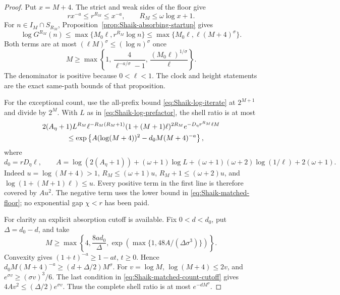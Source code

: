 \begin{proof}
Put \(x=M+4\). The strict and weak sides of the floor give
\begin{equation}\label{eq:Shaik-matched-floor}
 r x^{-a}\le r^{R_M}\le x^{-a},\qquad
 R_M\le\omega\log x+1 .
\end{equation}
For \(n\in I_M\cap S_{R_M}\),
Proposition~\ref{prop:Shaik-absorbing-startup} gives
\[
 \log G^{R_M}(n)
 \le\max\{M_0\ell,r^{R_M}\log n\}
 \le\max\{M_0\ell,\ell(M+4)^\sigma\}.
\]
Both terms are at most \((\ell M)^\sigma\le(\log n)^\sigma\)
once
\begin{equation}\label{eq:Shaik-matched-landing-cutoff}
 M\ge
 \max\left\{1,\,
 \frac4{\ell^{-a/\sigma}-1},\,
 \frac{(M_0\ell)^{1/\sigma}}{\ell}\right\}.
\end{equation}
The denominator is positive because \(0<\ell<1\).
The clock and height statements are the exact same-path bounds
of that proposition.

For the exceptional count, use the all-prefix bound
\eqref{eq:Shaik-log-iterate} at \(2^{M+1}\) and divide by \(2^M\).
With \(L\) as in \eqref{eq:Shaik-log-prefactor}, the shell ratio is at most
\begin{align}
 &2(A_\eta+1)L^{R_M}\ell^{-R_M(R_M+1)}
        (1+(M+1)\ell)^{2R_M}
        e^{-D_\eta r^{R_M}\ell M}\nonumber\\
 &\hspace{12mm}\le
 \exp\left\{A(\log(M+4))^2
             -d_0 M(M+4)^{-a}\right\},\label{eq:Shaik-matched-shell}
\end{align}
where
\[
 d_0=rD_\eta\ell,\qquad
 A=\log(2(A_\eta+1))+(\omega+1)\log L
    +(\omega+1)(\omega+2)\log(1/\ell)+2(\omega+1).
\]
Indeed \(u=\log(M+4)>1\), \(R_M\le(\omega+1)u\),
\(R_M+1\le(\omega+2)u\), and
\(\log(1+(M+1)\ell)\le u\).
Every positive term in the first line is therefore covered by
\(Au^2\). The negative term uses the lower bound in
\eqref{eq:Shaik-matched-floor}; no exponential gap \(\chi<r\)
has been paid.

For clarity an explicit absorption cutoff is available.
Fix \(0<d<d_0\), put \(\Delta=d_0-d\), and take
\begin{equation}\label{eq:Shaik-matched-count-cutoff}
 M\ge
 \max\left\{4,\frac{8ad_0}{\Delta},
       \exp\left(\max\{1,48A/(\Delta\sigma^3)\}\right)\right\}.
\end{equation}
Convexity gives \((1+t)^{-a}\ge1-at\), \(t\ge0\).
Hence \(d_0M(M+4)^{-a}\ge(d+\Delta/2)M^\sigma\).
For \(v=\log M\), \(\log(M+4)\le2v\), and
\(e^{\sigma v}\ge(\sigma v)^3/6\).
The last condition in \eqref{eq:Shaik-matched-count-cutoff} gives
\(4Av^2\le(\Delta/2)e^{\sigma v}\).
Thus the complete shell ratio is at most \(e^{-dM^\sigma}\).


\end{proof}
